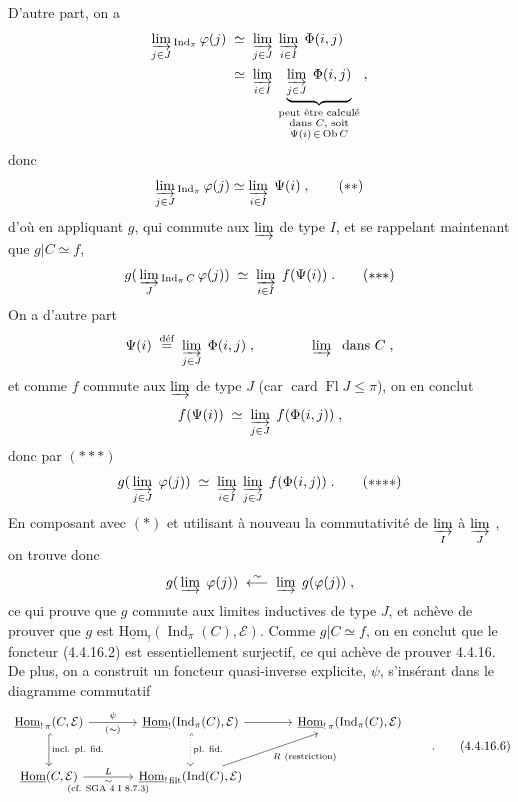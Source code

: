 \documentclass[11pt]{article}
\newcommand{\msp}[1]{\marginpar{\footnotesize [#1]}}
\newcommand{\uHom}{\underline{\mathrm{Hom}}}
\newcommand{\Ob}{\mathrm{Ob}\,}
\newcommand{\card}{\operatorname{card}}
\newcommand{\Fl}{\operatorname{Fl}}
\newcommand{\Ind}{\operatorname{Ind}}
\begin{document}
D'autre part, on a
\[
\begin{aligned}
\varinjlim_{j\in J}{}_{\Ind_\pi}\,\varphi(j)\;&\simeq\;\varinjlim_{j\in J}\;\varinjlim_{i\in I}\;\Phi(i,j)\\
&\simeq\;\varinjlim_{i\in I}\;\underbrace{\varinjlim_{j\in J}\;\Phi(i,j)}_{\substack{\text{peut être calculé}\\ \text{dans $C$, soit}\\ \Psi(i)\,\in\,\Ob C}}\;,
\end{aligned}
\]
donc
\[
\varinjlim_{j\in J}{}_{\Ind_\pi}\,\varphi(j)\simeq\varinjlim_{i\in I}\;\Psi(i)\;, \tag*{$(**)$}
\]
\msp{page 105}
d'où en appliquant $g$, qui commute aux $\varinjlim$ de type $I$, et se rappelant maintenant que $g|C\simeq f$,
\[
g(\,\varinjlim_{J}{}_{\Ind_\pi C}\,\varphi(j))\;\simeq\;\varinjlim_{i\in I}\;f(\Psi(i))\;. \tag*{$(*{*}*)$}
\]
On a d'autre part
\[
\Psi(i)\;\overset{\text{déf}}{=}\;\varinjlim_{j\in J}\;\Phi(i,j)\;,\qquad\qquad \varinjlim\;\text{ dans } C\;,
\]
et comme $f$ commute aux $\varinjlim$ de type $J$ (car $\card\Fl J\leqslant\pi$), on en conclut
\[
f(\Psi(i))\;\simeq\;\varinjlim_{j\in J}\;f(\Phi(i,j))\;,
\]
donc par $(*{*}*)$
\[
g(\,\varinjlim_{j\in J}\;\varphi(j))\;\simeq\;\varinjlim_{i\in I}\;\varinjlim_{j\in J}\;f(\Phi(i,j))\;. \tag*{$(*{*}{*}*)$}
\]
En composant avec $(*)$ et utilisant à nouveau la commutativité de $\varinjlim\limits_{I}$ à $\varinjlim\limits_{J}$ , on trouve donc
\[
g(\,\varinjlim\;\varphi(j))\;\overset{\sim}{\longleftarrow}\;\varinjlim\;g(\varphi(j))\;,
\]
ce qui prouve que $g$ commute aux limites inductives de type $J$, et achève de prouver que $g$ est $\uHom_{!}(\Ind_\pi(C),\mathcal{E})$. Comme $g|C\simeq f$, on en conclut que le foncteur (4.4.16.2) est essentiellement surjectif, ce qui achève de prouver 4.4.16. De plus, on a construit un foncteur quasi-inverse explicite, $\psi$,
\msp{page 106}
s'insérant dans le diagramme commutatif
\[
\begin{tikzcd}[column sep=large, row sep=large]
\uHom_{!\,\pi}(C,\mathcal{E}) \arrow[r, "\psi", "(\sim)"'] \arrow[d, hook, "\text{incl. pl. fid.}"] & \uHom_{!}(\Ind_\pi(C),\mathcal{E}) \arrow[r] \arrow[d, hook, dotted, "\text{pl. fid.}"] & \uHom_{!\,\pi}(\Ind_\pi(C),\mathcal{E}) \\
\uHom(C,\mathcal{E}) \arrow[r, "L", "\substack{\sim\\ \text{(cf. SGA 4 I 8.7.3)}}"'] & \uHom_{!\,\mathrm{filt}}(\Ind(C),\mathcal{E}) \arrow[ur, "R\ \text{(restriction)}"'] &
\end{tikzcd}
\qquad.
\tag*{(4.4.16.6)} %
\]
\end{document}
